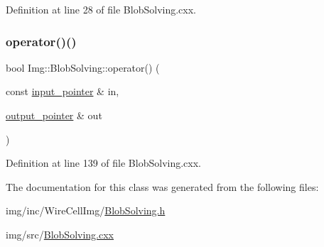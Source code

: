 Definition at line 28 of file Blob\+Solving.\+cxx.

\mbox{\label{class_wire_cell_1_1_img_1_1_blob_solving_ae1e30c85e18ad7e21a4d16c920ef8fae}} 
\subsubsection{\texorpdfstring{operator()()}{operator()()}}
{\footnotesize\ttfamily bool Img\+::\+Blob\+Solving\+::operator() (\begin{DoxyParamCaption}\item[{const \hyperlink{class_wire_cell_1_1_i_function_node_a55c0946156df9b712b8ad1a0b59b2db6}{input\+\_\+pointer} \&}]{in,  }\item[{\hyperlink{class_wire_cell_1_1_i_function_node_afc02f1ec60d31aacddf64963f9ca650b}{output\+\_\+pointer} \&}]{out }\end{DoxyParamCaption})\hspace{0.3cm}{\ttfamily [virtual]}}



Definition at line 139 of file Blob\+Solving.\+cxx.



The documentation for this class was generated from the following files\+:\begin{DoxyCompactItemize}
\item 
img/inc/\+Wire\+Cell\+Img/\hyperlink{_blob_solving_8h}{Blob\+Solving.\+h}\item 
img/src/\hyperlink{_blob_solving_8cxx}{Blob\+Solving.\+cxx}\end{DoxyCompactItemize}
